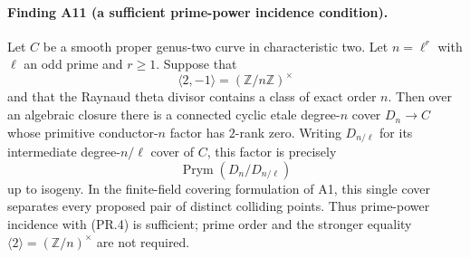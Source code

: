 \documentclass[11pt,a4paper]{article}
\begin{document}
\paragraph{Finding A11 (a sufficient prime-power incidence condition).}
Let $C$ be a smooth proper genus-two curve in characteristic two.
Let $n=\ell^r$ with $\ell$ an odd prime and $r\ge1$. Suppose that
\[
 \langle 2,-1\rangle=(\mathbb Z/n\mathbb Z)^\times
 \tag{PR.4}
\]
and that the Raynaud theta divisor contains a class of exact order
$n$. Then over an algebraic closure there is a connected cyclic etale
degree-$n$ cover $D_n\to C$ whose primitive conductor-$n$ factor has $2$-rank zero.
Writing $D_{n/\ell}$ for its intermediate degree-$n/\ell$ cover of
$C$, this factor is precisely
\[
 \operatorname{Prym}(D_n/D_{n/\ell})
\]
up to isogeny. In the finite-field covering formulation of A1, this
single cover separates every proposed pair of distinct colliding
points. Thus prime-power incidence with (PR.4) is sufficient; prime
order and the stronger equality $\langle2\rangle=(\mathbb Z/n)^\times$
are not required.
\end{document}
